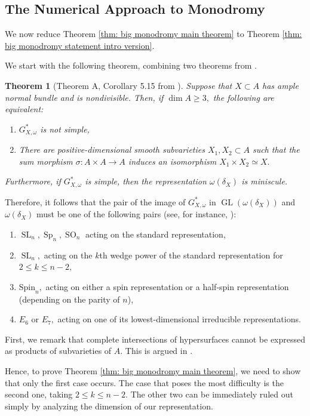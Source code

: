 \documentclass{article}
\newtheorem{thm}{Theorem}[section]
\theoremstyle{definition}
\theoremstyle{remark}
\DeclareMathOperator{\gl}{GL}
\DeclareMathOperator{\sll}{SL}
\DeclareMathOperator{\spp}{Sp}
\DeclareMathOperator{\so}{SO}
\begin{document}
\subsection{The Numerical Approach to Monodromy}\label{subsection: big monodromy}
We now reduce Theorem \ref{thm: big monodromy main theorem} to Theorem \ref{thm: big monodromy statement intro version}.
\par We start with the following theorem, combining two theorems from \cite{jklm23}.
\begin{thm}[Theorem A, Corollary 5.15 from \cite{jklm23}]\label{citedthm: simplicity of the Tannaka group}
Suppose that $X \subset A$ has ample normal bundle and is nondivisible. Then, if $\dim A \geq 3,$ the following are equivalent:
\begin{enumerate}
    \item $G_{X, \omega}^*$ is not simple,
    \item There are positive-dimensional smooth subvarieties $X_1, X_2 \subset A$ such that the sum morphism $\sigma: A \times A \rightarrow A$ induces an isomorphism $X_1 \times X_2 \simeq X.$ 
\end{enumerate}
Furthermore, if $G_{X, \omega}^*$ is simple, then the representation $\omega(\delta_X)$ is miniscule.
\end{thm}
Therefore, it follows that the pair of the image of $G_{X, \omega}^*$ in $\gl(\omega(\delta_X))$ and $\omega(\delta_X)$ must be one of the following pairs (see, for instance, \cite[Theorem 5.1.5]{Green_2013}):
\begin{enumerate}
    \item $\sll_n, \spp_n, \so_n$ acting on the standard representation,
    \item $\sll_n,$ acting on the $k$th wedge power of the standard representation for $2 \leq k \leq n-2,$
    \item $\text{Spin}_n,$ acting on either a spin representation or a half-spin representation (depending on the parity of $n$),
    \item $E_6$ or $E_7,$ acting on one of its lowest-dimensional irreducible representations.
\end{enumerate}
\par First, we remark that complete intersections of hypersurfaces cannot be expressed as products of subvarieties of $A.$ This is argued in \cite[Remark 6.3]{jklm23}.
\par Hence, to prove Theorem \ref{thm: big monodromy main theorem}, we need to show that only the first case occurs. The case that poses the most difficulty is the second one, taking $2 \leq k \leq n-2.$ The other two can be immediately ruled out simply by analyzing the dimension of our representation.
\end{document}
